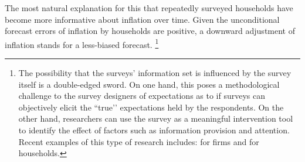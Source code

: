 \documentclass[12pt]{article}
\begin{document}
   The most natural explanation for this that repeatedly surveyed households have become more informative about inflation over time. Given the unconditional forecast errors of inflation by households are positive, a downward adjustment of inflation stands for a less-biased forecast.   \footnote{The possibility that the surveys' information set is influenced by the survey itself is a double-edged sword. On one hand, this poses a methodological challenge to the survey designers of expectations as to if surveys can objectively elicit the ``true’’ expectations held by the respondents. On the other hand, researchers can use the survey as a meaningful intervention tool to identify the effect of factors such as information provision and attention. Recent examples of this type of research includes: \citet{coibion2018firms} for firms and \citet{coibion2019monetary} for households.}
    
\end{document}
